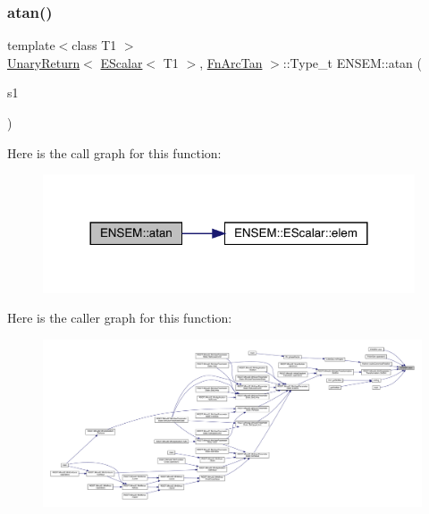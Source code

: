 \subsubsection{\texorpdfstring{atan()}{atan()}}
{\footnotesize\ttfamily template$<$class T1 $>$ \\
\mbox{\hyperlink{structENSEM_1_1UnaryReturn}{Unary\+Return}}$<$ \mbox{\hyperlink{classENSEM_1_1EScalar}{E\+Scalar}}$<$ T1 $>$, \mbox{\hyperlink{structENSEM_1_1FnArcTan}{Fn\+Arc\+Tan}} $>$\+::Type\+\_\+t E\+N\+S\+E\+M\+::atan (\begin{DoxyParamCaption}\item[{const \mbox{\hyperlink{classENSEM_1_1EScalar}{E\+Scalar}}$<$ T1 $>$ \&}]{s1 }\end{DoxyParamCaption})\hspace{0.3cm}{\ttfamily [inline]}}

Here is the call graph for this function\+:
\nopagebreak
\begin{figure}[H]
\begin{center}
\leavevmode
\includegraphics[width=312pt]{d4/dca/group__escalar_ga3169598490417ab5713660967ec6b658_cgraph}
\end{center}
\end{figure}
Here is the caller graph for this function\+:
\nopagebreak
\begin{figure}[H]
\begin{center}
\leavevmode
\includegraphics[width=350pt]{d4/dca/group__escalar_ga3169598490417ab5713660967ec6b658_icgraph}
\end{center}
\end{figure}
\mbox{\label{group__escalar_ga9a9d48948d119981259ad0ebcb0acfea}} 
